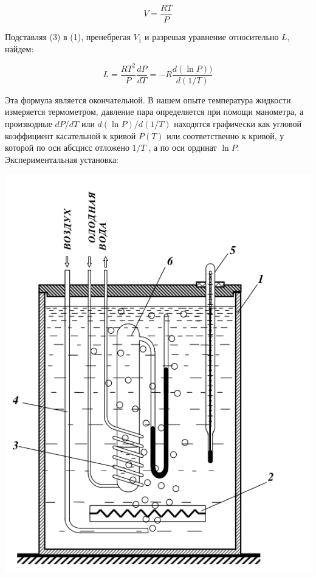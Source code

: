\documentclass[12pt,a4paper]{article}
\begin{document}
	\begin{equation}
		V = \dfrac{RT}{P}
	\end{equation}
	
	Подставляя (3) в (1), пренебрегая $V_1$ и разрешая уравнение относительно $L$, найдем:
	
	\begin{equation}
		L = \dfrac{RT^2}{P} \dfrac{dP}{dT} = -R \dfrac{d \left( \ln P \right))}{d \left( 1/T \right)}
	\end{equation}
	
	Эта формула является окончательной. В нашем опыте температура жидкости измеряется термометром, давление пара определяется при помощи манометра, а производные $dP/dT$ или $d(\ln P)/d(1/T)$ находятся графически как угловой коэффициент касательной к кривой $P(T)$ или соответственно к кривой, у которой по оси абсцисс отложено $1/T$ , а по оси ординат $\ln P$. \\
	
	Экспериментальная установка:
	
	\begin{center}
		\includegraphics[scale=0.4]{pic1.png}
	\end{center}
	
\end{document}

